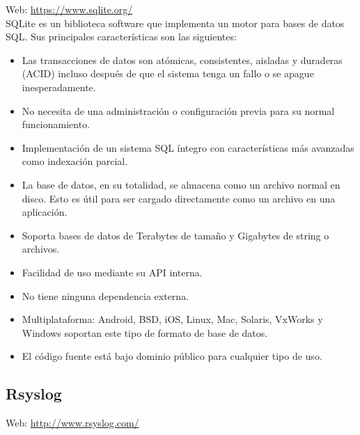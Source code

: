 Web: \url{https://www.sqlite.org/}\\

SQLite es un biblioteca software que implementa un motor para bases de datos SQL. Sus principales características son las siguientes:

\begin{itemize}
\item Las transacciones de datos son atómicas, consistentes, aisladas y duraderas (ACID) incluso después de que el sistema tenga un fallo o se apague inesperadamente.
\item No necesita de una administración o configuración previa para su normal funcionamiento.
\item Implementación de un sistema SQL íntegro con características más avanzadas como indexación parcial.
\item La base de datos, en su totalidad, se almacena como un archivo normal en disco. Esto es útil para ser cargado directamente como un archivo en una aplicación.
\item Soporta bases de datos de Terabytes de tamaño y Gigabytes de string o archivos.
\item Facilidad de uso mediante su API interna.
\item No tiene ninguna dependencia externa.
\item Multiplataforma: Android, BSD, iOS, Linux, Mac, Solaris, VxWorks y Windows soportan este tipo de formato de base de datos.
\item El código fuente está bajo dominio público para cualquier tipo de uso.
\end{itemize}

\subsection{Rsyslog}

Web: \url{http://www.rsyslog.com/}\\

